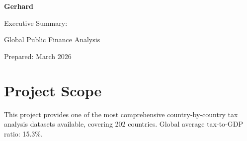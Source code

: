 \documentclass[11pt,letterpaper]{article}
\begin{document}
\begin{titlepage}
\centering
\vspace*{2cm}
{\Huge\bfseries Gerhard\par}
\vspace{1cm}
{\LARGE Executive Summary:\par}
{\LARGE Global Public Finance Analysis\par}
\vfill
{\large Prepared: March 2026\par}
\end{titlepage}

\section{Project Scope}

This project provides one of the most comprehensive country-by-country tax analysis datasets available, covering 202 countries. Global average tax-to-GDP ratio: 15.3\%.
\end{document}
